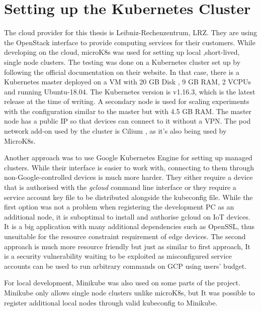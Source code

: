 \section{Setting up the Kubernetes Cluster}
The cloud provider for this thesis is Leibniz-Rechenzentrum, LRZ. They are using the OpenStack \cite{openstack} interface to provide computing services for their customers. While developing on the cloud, microK8s was used for setting up local ,short-lived, single node clusters. The testing was done on a Kubernetes cluster set up by following the official documentation on their website. In that case, there is a Kubernetes master deployed on a VM with 20 GB Disk , 9 GB RAM, 2 VCPUs and running Ubuntu-18.04. The Kubernetes version is v1.16.3, which is the latest release at the time of writing. A secondary node is used for scaling experiments with the configuration similar to the master but with 4.5 GB RAM. The master node has a public IP so that devices can connect to it without a VPN. The pod network add-on used by the cluster is Cilium \cite{cilium}, as it's also being used by MicroK8s.

Another approach was to use Google Kubernetes Engine for setting up managed clusters. While their interface is easier to work with, connecting to them through non-Google-controlled devices is much more harder. They either require a device that is authorised with the \textit{gcloud} command line interface or they require a service account key file to be distributed alongside the kubeconfig file. While the first option was not a problem when registering the development PC as an additional node, it is suboptimal to install and authorise gcloud on IoT devices. It is a big application with many additional dependencies such as OpenSSL, thus unsuitable for the resource constraint requirement of edge devices. The second approach is much more resource friendly but just as similar to first approach, It is a security vulnerability waiting to be exploited as misconfigured service accounts can be used to run arbitrary commands on GCP using users' budget.

For local development, Minikube was also used on some parts of the project. Minikube only allows single node clusters unlike microK8s, but It was possible to register additional local nodes through valid kubeconfig to Minikube.
